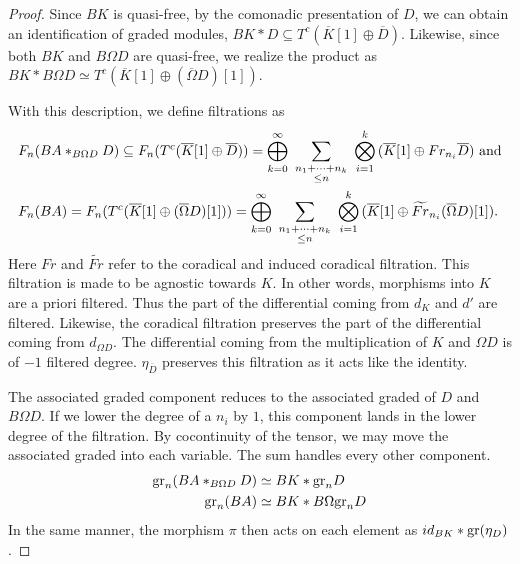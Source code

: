 \documentclass[../thesis.tex]{subfiles}
\begin{document}
\begin{proof}
                Since $BK$ is quasi-free, by the comonadic presentation of $D$, we can obtain an identification of graded modules, $BK\ast D \subseteq T^c(\overline{K}[1]\oplus \overline{D})$. Likewise, since both $BK$ and $B\Omega D$ are quasi-free, we realize the product as $BK\ast B\Omega D \simeq T^c(\overline{K}[1]\oplus (\overline{\Omega}D)[1])$.

                With this description, we define filtrations as
                \begin{align*}
                    & F_n(BA\ast_{B\Omega D}D) \subseteq F_n(T^c(\overline{K}[1]\oplus \overline{D})) = \bigoplus_{k=0}^\infty\,\,\sum_{\substack{n_1+\cdots+n_k \\ \leq n}}\,\,\bigotimes_{i = 1}^k\,(\overline{K}[1]\oplus Fr_{n_i}\overline{D})\tt{ and} \\
                    & F_n(BA) = F_n(T^c(\overline{K}[1]\oplus(\overline{\Omega}D)[1])) = \bigoplus_{k=0}^\infty\,\,\sum_{\substack{n_1+\cdots+n_k \\ \leq n}}\,\,\bigotimes_{i=1}^k\,(\overline{K}[1]\oplus\widetilde{Fr}_{n_i}(\overline{\Omega}D)[1])\tt{.}
                \end{align*}
                Here $Fr$ and $\widetilde{Fr}$ refer to the coradical and induced coradical filtration. This filtration is made to be agnostic towards $K$. In other words, morphisms into $K$ are a priori filtered. Thus the part of the differential coming from $d_K$ and $d'$ are filtered. Likewise, the coradical filtration preserves the part of the differential coming from $d_{\Omega D}$. The differential coming from the multiplication of $K$ and $\Omega D$ is of $-1$ filtered degree. $\eta_{\overline{D}}$ preserves this filtration as it acts like the identity.

                The associated graded component reduces to the associated graded of $D$ and $B\Omega D$. If we lower the degree of a $n_i$ by $1$, this component lands in the lower degree of the filtration. By cocontinuity of the tensor, we may move the associated graded into each variable. The sum handles every other component.
                \begin{align*}
                    \tt{gr}_n(BA\ast_{B\Omega D}D) & \simeq BK \ast \tt{gr}_nD \\
                    \tt{gr}_n(BA) & \simeq BK\ast B\Omega \tt{gr}_nD
                \end{align*}
                In the same manner, the morphism $\pi$ then acts on each element as $id_{BK}\ast \tt{gr}(\eta_D)$.


\end{proof}
\end{document}
